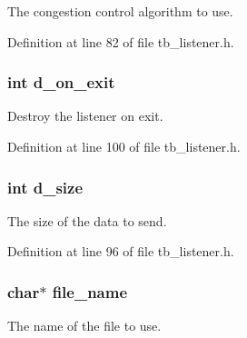 The congestion control algorithm to use. 



Definition at line 82 of file tb\-\_\-listener.\-h.

\hypertarget{structtb__test__params__t_a093a636a4cc3aec4f564b9ab29081b59}{
\subsubsection[{d\-\_\-on\-\_\-exit}]{\setlength{\rightskip}{0pt plus 5cm}int d\-\_\-on\-\_\-exit}}\label{structtb__test__params__t_a093a636a4cc3aec4f564b9ab29081b59}


Destroy the listener on exit. 



Definition at line 100 of file tb\-\_\-listener.\-h.

\hypertarget{structtb__test__params__t_a848d9c2765e62bac90bee8355062858a}{
\subsubsection[{d\-\_\-size}]{\setlength{\rightskip}{0pt plus 5cm}int d\-\_\-size}}\label{structtb__test__params__t_a848d9c2765e62bac90bee8355062858a}


The size of the data to send. 



Definition at line 96 of file tb\-\_\-listener.\-h.

\hypertarget{structtb__test__params__t_a8505c513bc640d1f69e5f76fb32b24a8}{
\subsubsection[{file\-\_\-name}]{\setlength{\rightskip}{0pt plus 5cm}char$\ast$ file\-\_\-name}}\label{structtb__test__params__t_a8505c513bc640d1f69e5f76fb32b24a8}


The name of the file to use. 



